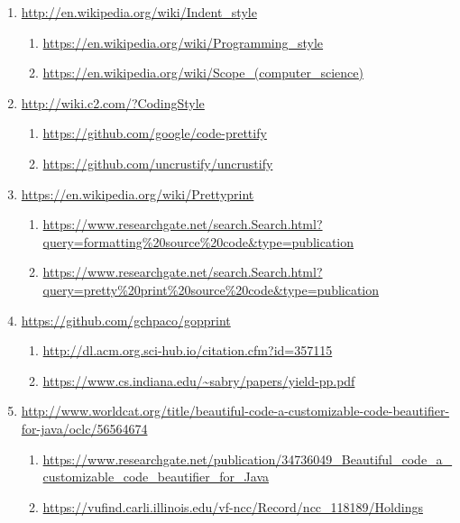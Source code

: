 \begin{sloppypar}
\begin{myquote}
\begin{enumerate}[leftmargin=*,parsep=0pt]
    \item \url{http://en.wikipedia.org/wiki/Indent_style}
    \begin{enumerate}[nolistsep,topsep=0pt,label=$\star$]
        \item \url{https://en.wikipedia.org/wiki/Programming_style}
        \item \url{https://en.wikipedia.org/wiki/Scope_(computer_science)}
    \end{enumerate}

    \item \url{http://wiki.c2.com/?CodingStyle}
    \begin{enumerate}[nolistsep,topsep=0pt,label=$\star$]
        \item \url{https://github.com/google/code-prettify}
        \item \url{https://github.com/uncrustify/uncrustify}
    \end{enumerate}

    \item \url{https://en.wikipedia.org/wiki/Prettyprint}
    \begin{enumerate}[nolistsep,topsep=0pt,label=$\star$]
        \item \url{https://www.researchgate.net/search.Search.html?query=formatting%20source%20code&type=publication}
        \item \url{https://www.researchgate.net/search.Search.html?query=pretty%20print%20source%20code&type=publication}
    \end{enumerate}

    \item \url{https://github.com/gchpaco/gopprint}
    \begin{enumerate}[nolistsep,topsep=0pt,label=$\star$]
        \item \url{http://dl.acm.org.sci-hub.io/citation.cfm?id=357115}
        \item \url{https://www.cs.indiana.edu/~sabry/papers/yield-pp.pdf}
    \end{enumerate}

    \item \url{http://www.worldcat.org/title/beautiful-code-a-customizable-code-beautifier-for-java/oclc/56564674}
    \begin{enumerate}[nolistsep,topsep=0pt,label=$\star$]
        \item \url{https://www.researchgate.net/publication/34736049_Beautiful_code_a_customizable_code_beautifier_for_Java}
        \item \url{https://vufind.carli.illinois.edu/vf-ncc/Record/ncc_118189/Holdings}
    \end{enumerate}


\end{enumerate}
\end{myquote}
\end{sloppypar}
